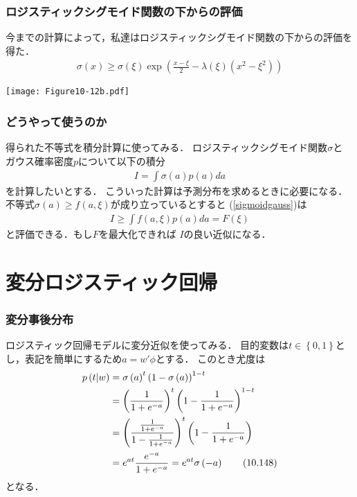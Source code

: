 \documentclass[10pt,usepdftitle=false,hyperref={unicode}]{beamer}
\newcommand{\paref}[1]{{\fontfamily{cmr}\selectfont (\ref{#1})}}
\newcommand{\parentheses}[1]{\left(#1\right)}
\newcommand{\braces}[1]{\left\{#1\right\}}
\begin{document}
\begin{frame}
\frametitle{ロジスティックシグモイド関数の下からの評価}
今までの計算によって，私達はロジスティックシグモイド関数の下からの評価を得た．
\begin{align*}
    \sigma\parentheses{x} \geq \sigma\parentheses{\xi}\exp\parentheses{\frac{x - \xi}{2} - \lambda\parentheses{\xi}\parentheses{x^2 - \xi^2}}
\end{align*}

\smallskip

\begin{center}
    \texttt{[image: Figure10-12b.pdf]}
\end{center}
\end{frame}

\begin{frame}
\frametitle{どうやって使うのか}
得られた不等式を積分計算に使ってみる．
ロジスティックシグモイド関数$\sigma$と
ガウス確率密度$p$について以下の積分
\begin{align}
    I = \int \sigma\parentheses{a}p\parentheses{a}da \tag{10.145} \label{sigmoidgauss}
\end{align}
を計算したいとする．
こういった計算は予測分布を求めるときに必要になる．
不等式$\sigma\parentheses{a} \geq f\parentheses{a,\xi}$が成り立っているとすると
\paref{sigmoidgauss}は
\begin{align}
    I \geq \int f\parentheses{a,\xi}p\parentheses{a}da = F\parentheses{\xi} \tag{10.146}
\end{align}
と評価できる．もし$F$を最大化できれば
$I$の良い近似になる．
\end{frame}

\section{変分ロジスティック回帰}
\begin{frame}
\frametitle{変分事後分布}
ロジスティック回帰モデルに変分近似を使ってみる．
目的変数は$t \in \braces{0,1}$とし，表記を簡単にするため$a = w'\phi$とする．
このとき尤度は
\begin{align}
    p\parentheses{t|w}
    &= \sigma\parentheses{a}^t\parentheses{1 - \sigma\parentheses{a}}^{1-t}\notag \\
    &= \parentheses{\frac{1}{1 + e^{-a}}}^t \parentheses{1 - \frac{1}{1 + e^{-a}}}^{1 - t} \notag \\
    &= \parentheses{\frac{\frac{1}{1 + e^{-a}}}{1 - \frac{1}{1 + e^{-a}}}}^t \parentheses{1 - \frac{1}{1 + e^{-a}}}\notag \\
    &= e^{at} \frac{e^{-a}}{1 + e^{-a}} = e^{at}\sigma\parentheses{-a} \tag{10.148}
\end{align}
となる．
\end{frame}
\end{document}
